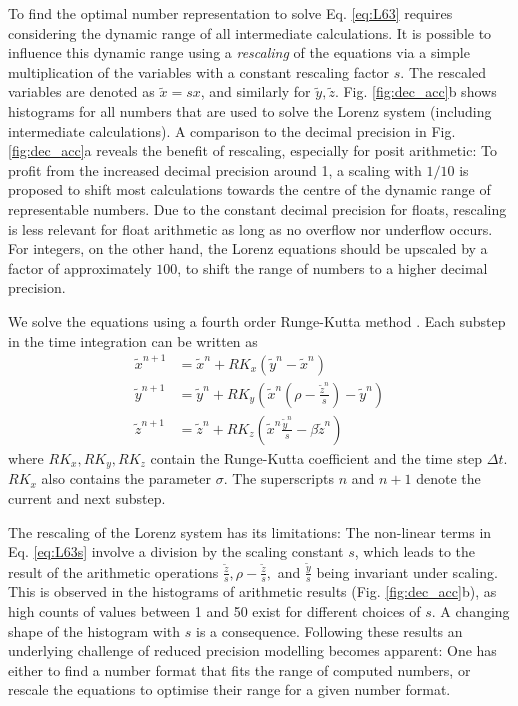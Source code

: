 \documentclass[draft]{agujournal2019}
\begin{document}
To find the optimal number representation to solve Eq. \ref{eq:L63} requires considering the dynamic range of all intermediate calculations. It is possible to influence this dynamic range using a \emph{rescaling} of the equations via a simple multiplication of the variables with a constant rescaling factor $s$. The rescaled variables are denoted as $\tilde{x} = sx$, and similarly for $\tilde{y},\tilde{z}$. Fig. \ref{fig:dec_acc}b shows histograms for all numbers that are used to solve the Lorenz system (including intermediate calculations). A comparison to the decimal precision in Fig. \ref{fig:dec_acc}a reveals the benefit of rescaling, especially for posit arithmetic: To profit from the increased decimal precision around 1, a scaling with $1/10$ is proposed to shift most calculations towards the centre of the dynamic range of representable numbers. Due to the constant decimal precision for floats, rescaling is less relevant for float arithmetic as long as no overflow nor underflow occurs. For integers, on the other hand, the Lorenz equations should be upscaled by a factor of approximately $100$, to shift the range of numbers to a higher decimal precision.

We solve the equations using a fourth order Runge-Kutta method \cite{Butcher2008}. Each substep in the time integration can be written as 
\begin{subequations}
\begin{align}
\tilde{x}^{n+1} &= \tilde{x}^n + RK_x\left(\tilde{y}^n-\tilde{x}^n\right) \\
\tilde{y}^{n+1} &= \tilde{y}^n + RK_y\left(\tilde{x}^n(\rho - \frac{\tilde{z}^n}{s}) - \tilde{y}^n \right) \\
\tilde{z}^{n+1} &= \tilde{z}^n + RK_z\left(\tilde{x}^n\frac{\tilde{y}^n}{s} - \beta \tilde{z}^n\right)
\end{align}
\label{eq:L63s}%
\end{subequations}
where $RK_x,RK_y,RK_z$ contain the Runge-Kutta coefficient and the time step $\Delta t$.  $RK_x$ also contains the parameter $\sigma$. The superscripts $n$ and $n+1$ denote the current and next substep.

The rescaling of the Lorenz system has its limitations: The non-linear terms in Eq. \ref{eq:L63s} involve a division by the scaling constant $s$, which leads to the result of the arithmetic operations $\tfrac{\tilde{z}}{s}, \rho - \tfrac{\tilde{z}}{s},$ and $\tfrac{\tilde{y}}{s}$ being invariant under scaling. This is observed in the histograms of arithmetic results (Fig. \ref{fig:dec_acc}b), as high counts of values between 1 and 50 exist for different choices of $s$. A changing shape of the histogram with $s$ is a consequence. Following these results an underlying challenge of reduced precision modelling becomes apparent: One has either to find a number format that fits the range of computed numbers, or rescale the equations to optimise their range for a given number format.
\end{document}

